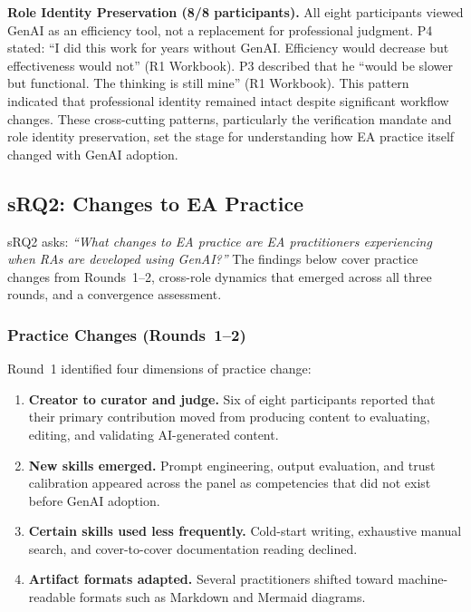 \textbf{Role Identity Preservation (8/8 participants).} All eight participants
viewed GenAI as an efficiency tool, not a replacement for professional judgment.
P4 stated: ``I did this work for years without GenAI. Efficiency would
decrease but effectiveness would not'' (R1 Workbook). P3 described that he
``would be slower but functional. The thinking is still mine'' (R1 Workbook).
This pattern indicated that professional identity remained intact despite
significant workflow changes. These cross-cutting patterns, particularly the
verification mandate and role identity preservation, set the stage for
understanding how EA practice itself changed with GenAI adoption.

\subsection{sRQ2: Changes to EA Practice}\label{subsec:srq2}

sRQ2 asks: \textit{``What changes to EA practice are EA practitioners
experiencing when RAs are developed using GenAI?''} The findings below cover
practice changes from Rounds~1--2, cross-role dynamics that emerged across all
three rounds, and a convergence assessment.

\subsubsection{Practice Changes (Rounds~1--2)}\label{subsubsec:practice-changes}

Round~1 identified four dimensions of practice change:

\begin{enumerate}
    \item \textbf{Creator to curator and judge.} Six of eight participants
    reported that their primary contribution moved from producing content to
    evaluating, editing, and validating AI-generated content.
    \item \textbf{New skills emerged.} Prompt engineering, output evaluation, and
    trust calibration appeared across the panel as competencies that did not exist
    before GenAI adoption.
    \item \textbf{Certain skills used less frequently.} Cold-start writing,
    exhaustive manual search, and cover-to-cover documentation reading declined.
    \item \textbf{Artifact formats adapted.} Several practitioners shifted toward
    machine-readable formats such as Markdown and Mermaid diagrams.
\end{enumerate}

